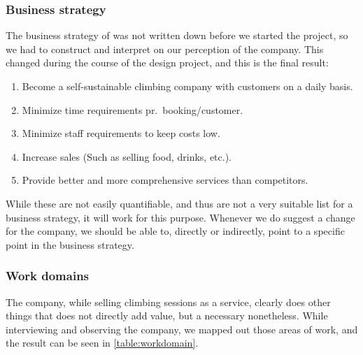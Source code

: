 \subsubsection{Business strategy}
The business strategy of \gomonkey{} was not written down before we started the
project, so we had to construct and interpret on our perception of the company.
This changed during the course of the design project, and this is the final 
result:

\begin{enumerate}
	\item Become a self-sustainable climbing company with customers on a daily basis.
	\item Minimize time requirements pr.\ booking/customer.
	\item Minimize staff requirements to keep costs low.
	\item Increase sales (Such as selling food, drinks, etc.).
	\item Provide better and more comprehensive services than competitors.
\end{enumerate}

While these are not easily quantifiable, and thus are not a very suitable list
for a business strategy, it will work for this purpose. Whenever we do suggest
a change for the company, we should be able to, directly or indirectly, point to
a specific point in the business strategy.

\subsubsection{Work domains}
The company, while selling climbing sessions as a service, clearly does other
things that does not directly add value, but a necessary nonetheless.		%
While interviewing and observing the company, we mapped out those areas of 
work, and the result can be seen in \autoref{table:workdomain}.

